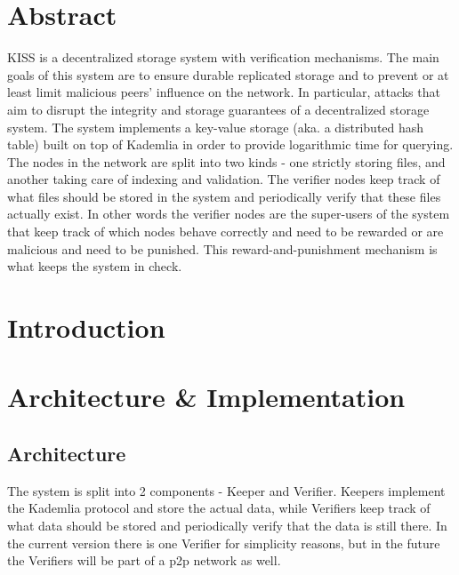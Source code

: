 \documentclass[ twoside,openright,titlepage,numbers=noenddot,headinclude,%
                footinclude=true,cleardoublepage=empty,abstractoff, %
                BCOR=5mm,paper=a4,fontsize=11pt,%
                ngerman,american,%
                ]{scrreprt}
\begin{document}
\frenchspacing
\raggedbottom
{} %
\pagestyle{plain}

\pagestyle{scrheadings}

\chapter{Abstract}
\label{cha:abstract}

KISS is a decentralized storage system with verification mechanisms.
The main goals of this system are to ensure durable replicated storage and to prevent or at least limit malicious peers' influence on the network.
In particular, attacks that aim to disrupt the integrity and storage guarantees of a decentralized storage system.
The system implements a key-value storage (aka. a distributed hash table) built on top of Kademlia in order
to provide logarithmic time for querying.
The nodes in the network are split into two kinds - one strictly storing files, and another taking care of indexing and validation.
The verifier nodes keep track of what files should be stored in the system and periodically verify that these files actually exist.
In other words the verifier nodes are the super-users of the system that keep track of which nodes behave correctly
and need to be rewarded or are malicious and need to be punished.
This reward-and-punishment mechanism is what keeps the system in check.

\chapter{Introduction}
\label{cha:Introduction}

\chapter{Architecture \& Implementation}
\label{cha:arch-impl}

\section{Architecture}
\label{sec:architecture}

The system is split into 2 components - Keeper and Verifier.
Keepers implement the Kademlia protocol and store the actual data,
while Verifiers keep track of what data should be stored and periodically verify that the data is still there.
In the current version there is one Verifier for simplicity reasons,
but in the future the Verifiers will be part of a p2p network as well.
\end{document}
